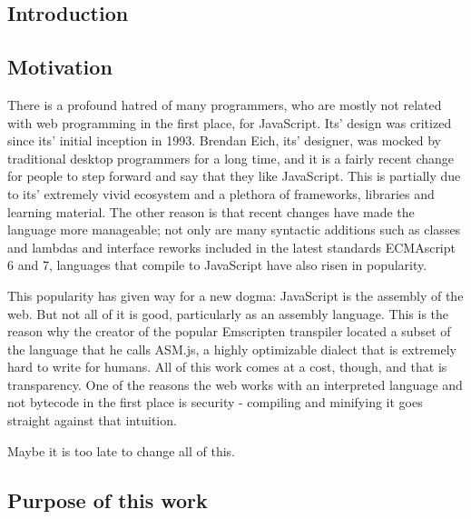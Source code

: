 \documentclass[oneside,11pt,xetex]{scrbook}
\begin{document}
\begin{onehalfspace}
\mainmatter

\pagestyle{headings}


\chapter{Introduction}
\label{chap:intro}

\section{Motivation}

There is a profound hatred of many programmers, who are mostly not related with web programming in the first place,
for JavaScript. Its' design was critized since its' initial inception in 1993. Brendan Eich, its' designer, was
mocked by traditional desktop programmers for a long time, and it is a fairly recent change for people to step
forward and say that they like JavaScript. This is partially due to its' extremely vivid ecosystem and a plethora of
frameworks, libraries and learning material. The other reason is that recent changes have made the language more
manageable; not only are many syntactic additions such as classes and lambdas and interface reworks included in the
latest standards ECMAscript 6 and 7, languages that compile to JavaScript have also risen in popularity.

This popularity has given way for a new dogma: JavaScript is the assembly of the web. But not all of it is good,
particularly as an assembly language. This is the reason why the creator of the popular Emscripten transpiler
located a subset of the language that he calls ASM.js, a highly optimizable dialect that is extremely hard to
write for humans. All of this work comes at a cost, though, and that is transparency. One of the reasons the web
works with an interpreted language and not bytecode in the first place is security - compiling and minifying it
goes straight against that intuition.

Maybe it is too late to change all of this.

\section{Purpose of this work}


\end{onehalfspace}
\end{document}
